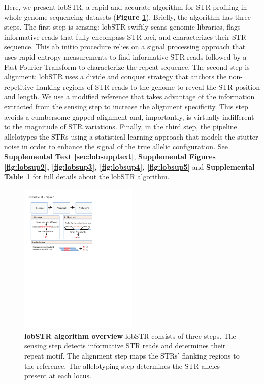 Here, we present lobSTR, a rapid and accurate algorithm for STR profiling in whole genome sequencing datasets (\textbf{Figure \ref{fig:lobfig1}}). Briefly, the algorithm has three steps. The first step is sensing: lobSTR swiftly scans genomic libraries, flags informative reads that fully encompass STR loci, and characterizes their STR sequence. This ab initio procedure relies on a signal processing approach that uses rapid entropy measurements to find informative STR reads followed by a Fast Fourier Transform to characterize the repeat sequence. The second step is alignment: lobSTR uses a divide and conquer strategy that anchors the non-repetitive flanking regions of STR reads to the genome to reveal the STR position and length. We use a modified reference that takes advantage of the information extracted from the sensing step to increase the alignment specificity. This step avoids a cumbersome gapped alignment and, importantly, is virtually indifferent to the magnitude of STR variations. Finally, in the third step, the pipeline allelotypes the STRs using a statistical learning approach that models the stutter noise in order to enhance the signal of the true allelic configuration. See \textbf{Supplemental Text \ref{sec:lobsupptext}}, \textbf{Supplemental Figures \ref{fig:lobsup2}, \ref{fig:lobsup3}, \ref{fig:lobsup4}, \ref{fig:lobsup5}} and \textbf{Supplemental Table 1} for full details about the lobSTR algorithm.

\begin{figure}[h!]
\centering
\label{fig:lobfig1}
\includegraphics[width=0.5\textwidth]{Figures/Chapter2/Fig1.pdf}
\caption{\textbf{lobSTR algorithm overview} lobSTR consists of three steps. The sensing step detects informative STR reads and determines their repeat motif. The alignment step maps the STRs' flanking regions to the reference. The allelotyping step determines the STR alleles present at each locus.}
\end{figure}

